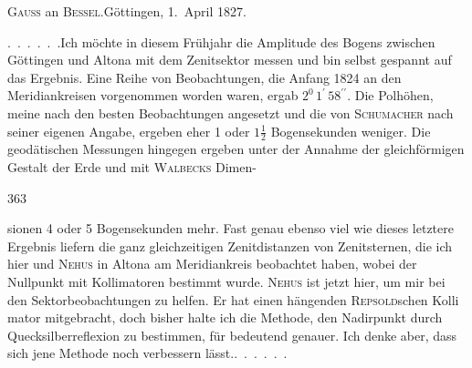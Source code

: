 \begin{center}
\textsc{Gauss} an \textsc{Bessel}.\quad Göttingen, 1.~April 1827.
\end{center}

\par\noindent\hspace*{\parindent}.\ .\ .\ .\ .\ .\quad Ich möchte in diesem Frühjahr die Amplitude des Bogens zwischen
Göttingen und Altona mit dem Zenitsektor messen und bin selbst gespannt
auf das Ergebnis. Eine Reihe von Beobachtungen, die Anfang
1824 an den Meridiankreisen vorgenommen worden waren, ergab \(2^{0}\,1^{\prime}\,58^{\prime\prime}\). Die Polhöhen, meine nach den
besten Beobachtungen angesetzt und die von \textsc{Schumacher} nach seiner eigenen Angabe, ergeben
eher 1 oder \(1\frac{1}{2}\) Bogensekunden weniger. Die geodätischen Messungen hingegen
ergeben unter der Annahme der gleichförmigen Gestalt der Erde und mit \textsc{Walbecks} Dimen-
\par\clearpage
{}\hfill363\par\medskip
\noindent sionen 4 oder 5 Bogensekunden mehr. Fast genau ebenso viel wie dieses
letztere Ergebnis liefern die ganz gleichzeitigen Zenitdistanzen von Zenitsternen,
die ich hier und \textsc{Nehus} in Altona am Meridiankreis beobachtet haben, wobei
der Nullpunkt mit Kollimatoren bestimmt wurde. \textsc{Nehus} ist jetzt hier, um mir bei
den Sektorbeobachtungen zu helfen. Er hat einen hängenden \textsc{Repsold}schen Kolli\-%
mator mitgebracht, doch bisher halte ich die Methode, den Nadirpunkt durch
Quecksilberreflexion zu bestimmen, für bedeutend genauer. Ich denke aber, dass sich jene Methode
noch verbessern lässt.\quad\mbox{.\ .\ .\ .\ .\ .}
